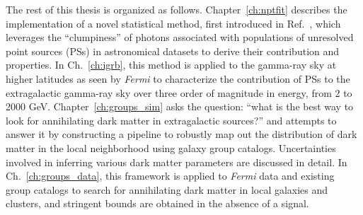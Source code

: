 The rest of this thesis is organized as follows. Chapter~\ref{ch:nptfit} describes the implementation of a novel statistical method, first introduced in Ref.~\cite{Lee:2015fea}, which leverages the ``clumpiness'' of photons associated with populations of unresolved point sources (PSs) in astronomical datasets to derive their contribution and properties. In Ch.~\ref{ch:igrb}, this method is applied to the gamma-ray sky at higher latitudes as seen by \emph{Fermi} to characterize the contribution of PSs to the extragalactic gamma-ray sky over three order of magnitude in energy, from 2 to 2000 GeV. Chapter~\ref{ch:groups_sim} asks the question: ``what is the best way to look for annihilating dark matter in extragalactic sources?'' and attempts to answer it by constructing a pipeline to robustly map out the distribution of dark matter in the local neighborhood using galaxy group catalogs. Uncertainties involved in inferring various dark matter parameters are discussed in detail. In Ch.~\ref{ch:groups_data}, this framework is applied to \emph{Fermi} data and existing group catalogs to search for annihilating dark matter in local galaxies and clusters, and stringent bounds are obtained in the absence of a signal. 

\sectionline


